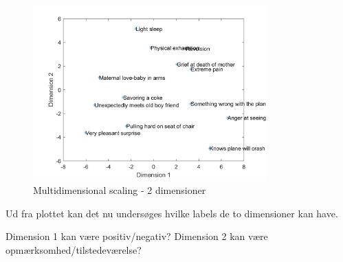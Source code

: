 \begin{figure}[H]
\centering
\includegraphics[width = 0.8\textwidth]{Figure/multidimensional.png} 
\caption{Multidimensional scaling - 2 dimensioner}
\label{fig:MDS}
\end{figure}

\noindent Ud fra
 plottet kan det nu undersøges hvilke labels de to dimensioner kan have. 

Dimension 1 kan være positiv/negativ? 
Dimension 2 kan være opmærksomhed/tilstedeværelse? 
